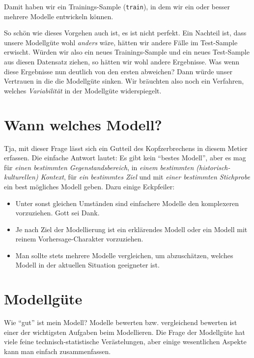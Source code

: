 \documentclass[12pt,ngerman,]{book}
\theoremstyle{definition}
\theoremstyle{definition}
\theoremstyle{remark}
\begin{document}
Damit haben wir ein Trainings-Sample (\texttt{train}), in dem wir ein
oder besser mehrere Modelle entwickeln können.

So schön wie dieses Vorgehen auch ist, es ist nicht perfekt. Ein
Nachteil ist, dass unsere Modellgüte wohl \emph{anders} wäre, hätten wir
andere Fälle im Test-Sample erwischt. Würden wir also ein neues
Trainings-Sample und ein neues Test-Sample aus diesen Datensatz ziehen,
so hätten wir wohl andere Ergebnisse. Was wenn diese Ergebnisse nun
deutlich von den ersten abweichen? Dann würde unser Vertrauen in die die
Modellgüte sinken. Wir bräuchten also noch ein Verfahren, welches
\emph{Variabilität} in der Modellgüte widerspiegelt.

\section{Wann welches Modell?}\label{wann-welches-modell}

Tja, mit dieser Frage lässt sich ein Gutteil des Kopfzerbrechens in
diesem Metier erfassen. Die einfache Antwort lautet: Es gibt kein
``bestes Modell'', aber es mag für \emph{einen bestimmten
Gegenstandsbereich}, in \emph{einem bestimmten (historisch-kulturellen)
Kontext}, für \emph{ein bestimmtes Ziel} und mit \emph{einer bestimmten
Stichprobe} ein best mögliches Modell geben. Dazu einige Eckpfeiler:

\begin{itemize}
\item
  Unter sonst gleichen Umständen sind einfachere Modelle den komplexeren
  vorzuziehen. Gott sei Dank.
\item
  Je nach Ziel der Modellierung ist ein erklärendes Modell oder ein
  Modell mit reinem Vorhersage-Charakter vorzuziehen.
\item
  Man sollte stets mehrere Modelle vergleichen, um abzuschätzen, welches
  Modell in der aktuellen Situation geeigneter ist.
\end{itemize}

\section{Modellgüte}\label{modellgute}

Wie ``gut'' ist mein Modell? Modelle bewerten bzw. vergleichend bewerten
ist einer der wichtigsten Aufgaben beim Modellieren. Die Frage der
Modellgüte hat viele feine technisch-statistische Verästelungen, aber
einige wesentlichen Aspekte kann man einfach zusammenfassen.
\end{document}
